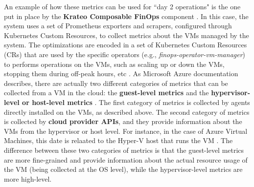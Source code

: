 An example of how these metrics can be used for ``day 2 operations" is the one put in place by the \textbf{Krateo Composable FinOps} component \cite{krateo_docs}.
In this case, the system uses a set of Prometheus exporters and scrapers, configured through Kubernetes Custom Resources, to collect metrics about the VMs managed by the system.
The optimizations are encoded in a set of Kubernetes Custom Resources (CRs) that are used by the specific operators (e.g., \textit{finops-operator-vm-manager}) to performs operations on the VMs, such as scaling up or down the VMs, stopping them during off-peak hours, etc \cite{krateo_docs}.
\newline
As Microsoft Azure documentation describes, there are actually two different categories of metrics that can be collected from a VM in the cloud: the \textbf{guest-level metrics} and the \textbf{hypervisor-level or host-level metrics} \cite{azure_vm_monitoring}.
The first category of metrics is collected by agents directly installed on the VMs, as described above.
The second category of metrics is collected by \textbf{cloud provider APIs}, and they provide information about the VMs from the hypervisor or host level.
For instance, in the case of Azure Virtual Machines, this date is relaated to the Hyper-V host that runs the VM \cite{azure_vm_monitoring}.
The difference between these two categories of metrics is that the guest-level metrics are more fine-grained and provide information about the actual resource usage of the VM (being collected at the OS level), while the hypervisor-level metrics are more high-level. \newline
